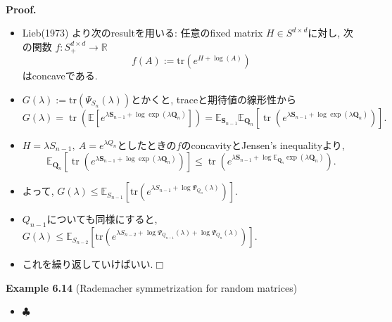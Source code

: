 \documentclass[unicode,aspectratio=169,11pt]{beamer}
\def\qed{\hfill $\Box$}
\def\endexample{\hfill $\clubsuit$}
\newcommand{\ex}{\mathbb{E}}
\newcommand{\bb}{\mathbb}
\newcommand{\trace}{\mathrm{tr}}
\begin{document}
\begin{frame}{}{}
  　\\
{\bf Proof.}
\begin{itemize}
  \item Lieb(1973) より次のresultを用いる: 任意のfixed matrix $H \in S^{d\times d}$に対し, 次の関数 $f : S^{d\times d}_+ \to \bb{R}$
        \[ f(A) := \trace(e^{H + \log(A)}) \]
        はconcaveである.
  \item $G(\lambda) := \trace(\Psi_{S_n}(\lambda))$とかくと, traceと期待値の線形性から
        \[
          G(\lambda)
          =\operatorname{tr}\left(\mathbb{E}\left[e^{\lambda \mathbf{S}_{n-1}+\log \exp \left(\lambda \mathbf{Q}_{n}\right)}\right]\right)
          =\mathbb{E}_{\mathbf{S}_{n-1}} \mathbb{E}_{\mathbf{Q}_{n}}\left[\operatorname{tr}\left(e^{\lambda \mathbf{S}_{n-1}+\log \exp \left(\lambda \mathbf{Q}_{n}\right)}\right)
          \right].
        \]
  \item $H = \lambda S_{n-1},\ A = e^{\lambda Q_n}$としたときの$f$のconcavityとJensen's inequalityより,
        \[
          \mathbb{E}_{\mathbf{Q}_{n}}\left[\operatorname{tr}\left(e^{\lambda \mathbf{S}_{n-1}+\log \exp \left(\lambda \mathbf{Q}_{n}\right)}\right)\right] \leq \operatorname{tr}\left(e^{\lambda \mathbf{S}_{n-1}+\log \mathbb{E}_{\mathbf{Q}_{n}} \exp \left(\lambda \mathbf{Q}_{n}\right)}\right).
        \]
  \item よって, $G(\lambda) \le \ex_{S_{n-1}}[\trace (e^{\lambda S_{n-1} + \log \Psi_{Q_n}(\lambda)})]$.
  \item $Q_{n-1}$についても同様にすると, $G(\lambda) \le \ex_{S_{n-2}}[\trace (e^{\lambda S_{n-2} + \log \Psi_{Q_{n-1}}(\lambda) + \log \Psi_{Q_n}(\lambda)})]$.
  \item これを繰り返していけばいい.\qed
\end{itemize}
\end{frame}

\begin{frame}{}{}
  {\bf Example 6.14} (Rademacher symmetrization for random matrices)
  \begin{itemize}
    \item \endexample
  \end{itemize}
\end{frame}
\end{document}
